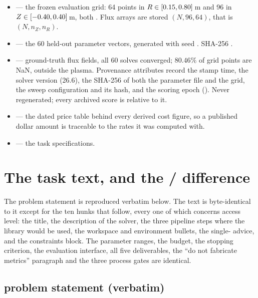 \begin{itemize}
\item {} --- the frozen evaluation grid:
  64 points in $R \in [0.15, 0.80]$\,m and 96 in $Z \in [-0.40,
  0.40]$\,m, both . Flux arrays are stored $(N, 96, 64)$, that
  is $(N, n_Z, n_R)$.
\item {} --- the 60 held-out parameter
  vectors, generated with seed . SHA-256
  .
\item {} --- ground-truth flux fields, all 60
  solves converged; $80.46\%$ of grid points are NaN, outside the plasma.
  Provenance attributes record the stamp time, the solver version (26.6), the
  SHA-256 of both the parameter file and the grid, the sweep configuration and
  its hash, and the scoring epoch (). Never regenerated; every
  archived score is relative to it.
\item {} --- the dated price table behind
  every derived cost figure, so a published dollar amount is traceable to the
  rates it was computed with.
\item {} --- the task specifications.
\end{itemize}

\section{The task text, and the \texorpdfstring{\Ltwo{}/\Lthree{}}{L2/L3} difference}
\label{app:tasktext}

The \Lthree{} problem statement is reproduced verbatim below. The \Ltwo{} text
is byte-identical to it except for the ten hunks that follow, every one of which
concerns access level: the title, the description of the solver, the three
pipeline steps where the library would be used, the workspace and environment
bullets, the single- advice, and the constraints block. The
parameter ranges, the budget, the stopping criterion, the evaluation interface,
all five deliverables, the ``do not fabricate metrics'' paragraph and the three
process gates are identical.

\subsection{\Lthree{} problem statement (verbatim)}


